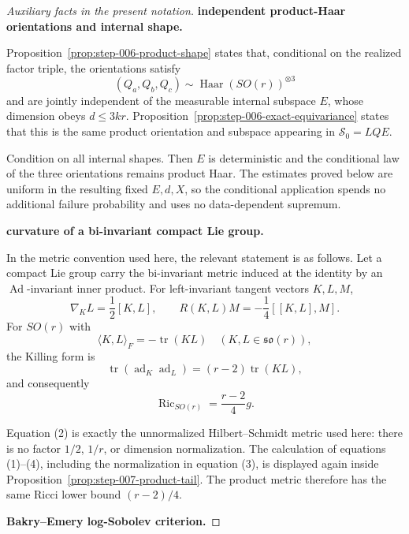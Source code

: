 \begin{proof}[Auxiliary facts in the present notation]


\medskip\noindent\textbf{independent product-Haar orientations and internal shape.}\par

Proposition~\ref{prop:step-006-product-shape} states that, conditional on the
realized factor triple, the orientations satisfy
\[
  (Q_a,Q_b,Q_c)\sim\operatorname{Haar}(SO(r))^{\otimes3}
\]
and are jointly independent of the measurable internal subspace \(E\), whose
dimension obeys \(d\le3kr\). Proposition~\ref{prop:step-006-exact-equivariance} states that this is the
same product orientation and subspace appearing in \(\mathscr S_0=LQE\).

Condition on all internal shapes.
Then \(E\) is deterministic and the conditional law of the three
orientations remains product Haar. The estimates proved below are uniform in
the resulting fixed \(E,d,X\), so the conditional application spends no
additional failure probability and uses no data-dependent supremum.


\medskip\noindent\textbf{curvature of a bi-invariant compact Lie group.}\par

In the metric convention used here, the relevant statement is as follows. Let a compact Lie group
carry the bi-invariant metric induced at the identity by an
\(\operatorname{Ad}\)-invariant inner product. For left-invariant tangent
vectors \(K,L,M\),
\[
  \nabla_KL=\frac12[K,L],
  \qquad
  R(K,L)M=-\frac14[[K,L],M].                                \tag{1}
\]
For \(SO(r)\) with
\[
  \langle K,L\rangle_F=-\operatorname{tr}(KL)
  \quad(K,L\in\mathfrak{so}(r)),                            \tag{2}
\]
the Killing form is
\[
  \operatorname{tr}(\operatorname{ad}_K\operatorname{ad}_L)
  =(r-2)\operatorname{tr}(KL),                              \tag{3}
\]
and consequently
\[
  \operatorname{Ric}_{SO(r)}=\frac{r-2}{4}g.                \tag{4}
\]

Equation (2) is exactly the unnormalized Hilbert--Schmidt metric used here:
there is no
factor \(1/2\), \(1/r\), or dimension normalization. The calculation of
equations (1)--(4), including the normalization in equation (3), is displayed
again inside Proposition~\ref{prop:step-007-product-tail}. The product metric
therefore has the same Ricci lower bound \((r-2)/4\).


\medskip\noindent\textbf{Bakry--Emery log-Sobolev criterion.}\par


\end{proof}
